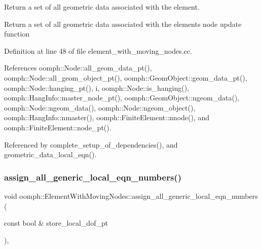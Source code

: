 Return a set of all geometric data associated with the element. 

Return a set of all geometric data associated with the element\textquotesingle{}s node update function 

Definition at line 48 of file element\+\_\+with\+\_\+moving\+\_\+nodes.\+cc.



References oomph\+::\+Node\+::all\+\_\+geom\+\_\+data\+\_\+pt(), oomph\+::\+Node\+::all\+\_\+geom\+\_\+object\+\_\+pt(), oomph\+::\+Geom\+Object\+::geom\+\_\+data\+\_\+pt(), oomph\+::\+Node\+::hanging\+\_\+pt(), i, oomph\+::\+Node\+::is\+\_\+hanging(), oomph\+::\+Hang\+Info\+::master\+\_\+node\+\_\+pt(), oomph\+::\+Geom\+Object\+::ngeom\+\_\+data(), oomph\+::\+Node\+::ngeom\+\_\+data(), oomph\+::\+Node\+::ngeom\+\_\+object(), oomph\+::\+Hang\+Info\+::nmaster(), oomph\+::\+Finite\+Element\+::nnode(), and oomph\+::\+Finite\+Element\+::node\+\_\+pt().



Referenced by complete\+\_\+setup\+\_\+of\+\_\+dependencies(), and geometric\+\_\+data\+\_\+local\+\_\+eqn().

\mbox{\label{classoomph_1_1ElementWithMovingNodes_a5fdaf955e508b80e5fd5673f574472d5}} 
\subsubsection{\texorpdfstring{assign\+\_\+all\+\_\+generic\+\_\+local\+\_\+eqn\+\_\+numbers()}{assign\_all\_generic\_local\_eqn\_numbers()}}
{\footnotesize\ttfamily void oomph\+::\+Element\+With\+Moving\+Nodes\+::assign\+\_\+all\+\_\+generic\+\_\+local\+\_\+eqn\+\_\+numbers (\begin{DoxyParamCaption}\item[{const bool \&}]{store\+\_\+local\+\_\+dof\+\_\+pt }\end{DoxyParamCaption})\hspace{0.3cm}{\ttfamily [protected]}, {\ttfamily [virtual]}}

